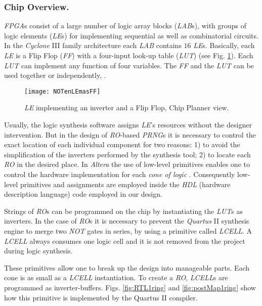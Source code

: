 \subsubsection{Chip Overview.}

\emph{FPGA}s consist of a large number of logic array blocks (\emph{LAB}s), with groups of logic elements (\emph{LE}s) for implementing sequential as well as
combinatorial circuits. In the \emph{Cyclone} III family architecture
each \emph{LAB} contains $16$ \emph{LE}s.
Basically, each \emph{LE} is a Flip Flop (\emph{FF}) with a
four-input look-up table (\emph{LUT})  (see Fig. \ref{fig:LE}). Each
\emph{LUT} can implement any function of
four variables. The \emph{FF} and the \emph{LUT} can be used together or independently, \cite{Altera}.

\begin{figure}
\begin{center}
\texttt{[image: NOTenLEmasFF]}
\caption{\emph{LE} implementing an inverter and a Flip Flop, Chip Planner
view.} \label{fig:LE}
\end{center}
\end{figure}

Usually, the logic synthesis software assigns \emph{LE}'s
resources without the designer intervention. But in the design of
\emph{RO}-based \emph{PRNG}s it is necessary to control the exact location of
each individual component for two reasons: 1) to avoid the
simplification of the inverters performed by the synthesis tool; 2) to locate
each \emph{RO} in the desired place. In \emph{Altera} the use of low-level primitives enables one to
control the hardware implementation for each \emph{cone of logic} \cite{LowLevel}. Consequently
low-level primitives and assignments are employed inside the \emph{HDL} (hardware description language) code employed in our design.

Strings of \emph{RO}s can be programmed on the chip by
instantiating the \emph{LUT}s as inverters.
In the case of \emph{RO}s it is necessary to prevent the \emph{Quartus} II synthesis engine to merge two \emph{NOT} gates in series, by using a primitive called \emph{LCELL}.
 A \emph{LCELL} always consumes one logic cell and it is not
removed from the project during logic synthesis.

These primitives allow one to break up the design into manageable parts. Each cone is as small as a \emph{LCELL} instantiation.
To create a \emph{RO}, \emph{LCELL}s are programmed as inverter-buffers. Figs. \ref{fig:RTL1ring} and \ref{fig:postMap1ring} show how this primitive is implemented by the Quartus II compiler.

